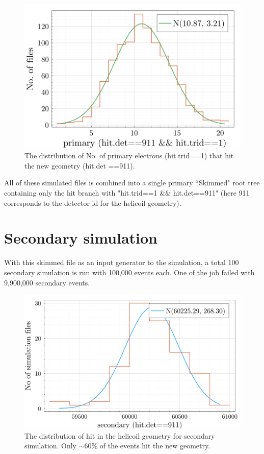 \documentclass[a4paper,12pt]{article}
\begin{document}
    \begin{figure}[h!]
        \centering
        \includegraphics[width=1\linewidth]{image/helicoil-20221121-113016-img-primary-trid-hit-count-hist.png} \caption{The distribution of No. of primary electrons (hit.trid==1) that hit the new geometry (hit.det ==911).}
        \label{fig:primary-dist}
    \end{figure}

    All of these simulated files is combined into a single primary ``Skimmed" root tree containing only the hit branch with "hit.trid==1 \&\& hit.det==911" (here 911 corresponds to the detector id for the helicoil geometry).

\section{Secondary simulation}
    With this skimmed file as an input generator to the simulation, a total 100 secondary simulation is run with 100,000 events each. One of the job failed with 9,900,000 secondary events.
    \begin{figure}[h!]
        \centering
        \includegraphics[width=1\linewidth]{image/helicoil-20221121-113016-img-secondary-det-hit-count-hist-not-normalized.png}
        \caption{The distribution of hit in the helicoil geometry for secondary simulation. Only $\sim 60$\% of the events hit the new geometry.}
        \label{fig:sec-hit-det-distrib}
    \end{figure}
\end{document}
